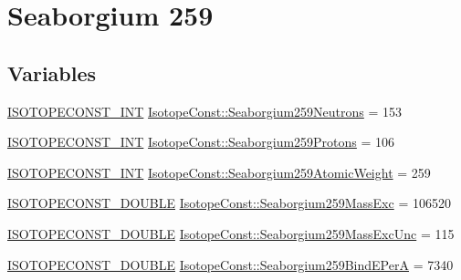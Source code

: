 \hypertarget{group___isotope_const-_seaborgium-_sg259}{}\section{Seaborgium 259}
\label{group___isotope_const-_seaborgium-_sg259}
\subsection*{Variables}
\begin{DoxyCompactItemize}
\item 
\mbox{\hyperlink{group___isotope_const-_macros_ga5f18360b3e99483a35c32d789e62621c}{I\+S\+O\+T\+O\+P\+E\+C\+O\+N\+S\+T\+\_\+\+I\+NT}} \mbox{\hyperlink{group___isotope_const-_seaborgium-_sg259_ga46ed5bbfb55a0bc9d3eeb84f9bc5fb27}{Isotope\+Const\+::\+Seaborgium259\+Neutrons}} = 153
\item 
\mbox{\hyperlink{group___isotope_const-_macros_ga5f18360b3e99483a35c32d789e62621c}{I\+S\+O\+T\+O\+P\+E\+C\+O\+N\+S\+T\+\_\+\+I\+NT}} \mbox{\hyperlink{group___isotope_const-_seaborgium-_sg259_ga521bbaaece1f6fff27df79b2327ca8dc}{Isotope\+Const\+::\+Seaborgium259\+Protons}} = 106
\item 
\mbox{\hyperlink{group___isotope_const-_macros_ga5f18360b3e99483a35c32d789e62621c}{I\+S\+O\+T\+O\+P\+E\+C\+O\+N\+S\+T\+\_\+\+I\+NT}} \mbox{\hyperlink{group___isotope_const-_seaborgium-_sg259_gac19e7e86ab70c59087d9fabd1021381d}{Isotope\+Const\+::\+Seaborgium259\+Atomic\+Weight}} = 259
\item 
\mbox{\hyperlink{group___isotope_const-_macros_ga8f45a7272ce02c0b4c65c44636ed719a}{I\+S\+O\+T\+O\+P\+E\+C\+O\+N\+S\+T\+\_\+\+D\+O\+U\+B\+LE}} \mbox{\hyperlink{group___isotope_const-_seaborgium-_sg259_gac24605149551b564bc9824acc46dc26e}{Isotope\+Const\+::\+Seaborgium259\+Mass\+Exc}} = 106520
\item 
\mbox{\hyperlink{group___isotope_const-_macros_ga8f45a7272ce02c0b4c65c44636ed719a}{I\+S\+O\+T\+O\+P\+E\+C\+O\+N\+S\+T\+\_\+\+D\+O\+U\+B\+LE}} \mbox{\hyperlink{group___isotope_const-_seaborgium-_sg259_ga40d0099b2d3f760d6729988df3023331}{Isotope\+Const\+::\+Seaborgium259\+Mass\+Exc\+Unc}} = 115
\item 
\mbox{\hyperlink{group___isotope_const-_macros_ga8f45a7272ce02c0b4c65c44636ed719a}{I\+S\+O\+T\+O\+P\+E\+C\+O\+N\+S\+T\+\_\+\+D\+O\+U\+B\+LE}} \mbox{\hyperlink{group___isotope_const-_seaborgium-_sg259_ga4fc0fdbdae58bcb602c16298f21941fd}{Isotope\+Const\+::\+Seaborgium259\+Bind\+E\+PerA}} = 7340
\item 

\end{DoxyCompactItemize}

